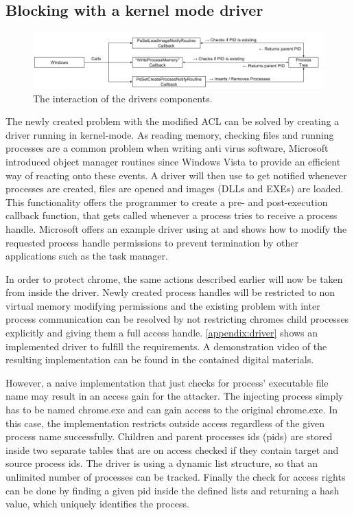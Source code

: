 \subsection{Blocking  with a kernel mode driver}
\begin{figure}[h]
\centering
\includegraphics[angle=90,scale=0.6]{sections/implementation/interaction.png}
\caption{The interaction of the drivers components.}
\label{fig:interaction}
\end{figure}
The newly created problem with the modified ACL can be solved by creating a driver running in kernel-mode. As reading memory, checking files and running processes are a common problem when writing anti virus software, Microsoft introduced object manager routines since Windows Vista to provide an efficient way of reacting onto these events. A driver will then use  to get notified whenever processes are created, files are opened and images (DLLs and EXEs) are loaded. This functionality offers the programmer to create a pre- and post-execution callback function, that gets called whenever a process tries to receive a process handle. Microsoft offers an example driver using  at \cite{github_obcallback} and shows how to modify the requested process handle permissions to prevent termination by other applications such as the task manager. 

In order to protect chrome, the same actions described earlier will now be taken from inside the driver. Newly created process handles will be restricted to non virtual memory modifying permissions and the existing problem with inter process communication can be resolved by not restricting chromes child processes explicitly and giving them a full access handle. \ref{appendix:driver} shows an implemented driver to fulfill the requirements. A demonstration video of the resulting implementation can be found in the contained digital materials.

However, a naive implementation that just checks for process' executable file name may result in an access gain for the attacker. The injecting process simply has to be named chrome.exe and can gain access to the original chrome.exe. In this case, the implementation restricts outside access regardless of the given process name successfully. Children and parent processes ids (pids) are stored inside two separate tables that are on access checked if they contain target and source process ids. The driver is using a dynamic list structure, so that an unlimited number of processes can be tracked. Finally the check for access rights can be done by finding a given pid inside the defined lists and returning a hash value, which uniquely identifies the process. 

